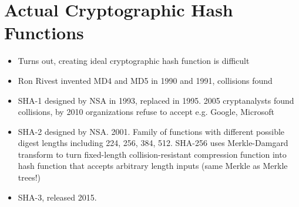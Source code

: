 \documentclass{article}
\begin{document}
\section*{Actual Cryptographic Hash Functions}
\begin{itemize}
\item Turns out, creating ideal cryptographic hash function is difficult
\item Ron Rivest invented MD4 and MD5 in 1990 and 1991, collisions found
\item SHA-1 designed by NSA in 1993, replaced in 1995. 2005 cryptanalysts found collisions, by 2010 organizations refuse to accept e.g. Google, Microsoft
\item SHA-2 designed by NSA. 2001. Family of functions with different possible digest lengths including 224, 256, 384, 512.
\subitem SHA-256 uses Merkle-Damgard transform to turn fixed-length collision-resistant compression function into hash function that accepts arbitrary length inputs (same Merkle as Merkle trees!)
\item SHA-3, released 2015.
\end{itemize}
\end{document}
